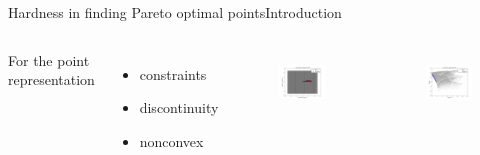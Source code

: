 \begin{frame}{Hardness in finding Pareto optimal points}{Introduction}
\begin{columns}
For the point representation
\begin{itemize}
\item constraints
\item discontinuity
\item nonconvex
\end{itemize}
	\begin{figure}
		\centering
		\includegraphics[width=.6\linewidth]{figure/point_solution_space.png}
		\label{fig:point_solution_space}
	\end{figure}
	\begin{figure}
		\centering
		\includegraphics[width=.6\linewidth]{figure/point_fitness_space.png}
		\label{fig:point_fitness_space}
	\end{figure}
\end{columns}
\end{frame}

